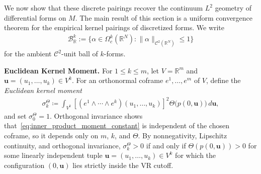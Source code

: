 \documentclass[11pt,reqno]{amsproc}
\numberwithin{equation}{section}
\newcommand{\R}{\mathbb{R}}
\newcommand{\bu}{\mathbf{u}}
\newcommand{\cB}{\mathcal{B}}
\newcommand{\cC}{\mathcal{C}}
\theoremstyle{definition}
\theoremstyle{plain}
\begin{document}
    We now show that these discrete pairings recover the continuum $L^2$ geometry of differential forms on $M$. The main result of this section is a uniform convergence theorem for the empirical kernel pairings of discretized forms.
    We write
    \begin{align} \label{eq:cB_ball}
        \cB_\R^k := \{\alpha \in \Omega^k_c(\R^N) : \|\alpha\|_{\cC^2(\R^N)} \leq 1\}
    \end{align}
    for the ambient $\cC^2$-unit ball of $k$-forms.

    \medskip
    \noindent\textbf{Euclidean Kernel Moment.}
        For $1\leq k\leq m$, let $V=\R^m$ and $\bu=(u_1,\ldots,u_k)\in V^k$. For an orthonormal coframe $e^1,\ldots,e^m$ of $V$, define the \emph{Euclidean kernel moment}
        \begin{align} \label{eq:inner_product_moment_constant}
            \sigma^\Theta_k
            \coloneqq
            \int_{V^k}
            \left[(e^1\wedge\cdots\wedge e^k)(u_1,\ldots,u_k)\right]^2
            \Theta\big(p(0,\bu)\big)\,d\bu,
        \end{align}
        and set $\sigma^\Theta_0=1$. Orthogonal invariance shows that~\eqref{eq:inner_product_moment_constant} is independent of the chosen coframe, so it depends only on $m$, $k$, and $\Theta$. By nonnegativity, Lipschitz continuity, and orthogonal invariance, $\sigma^\Theta_k>0$ if and only if $\Theta(p(0,\bu))>0$ for some linearly independent tuple $\bu=(u_1,\ldots,u_k)\in V^k$ for which the configuration $(0,\bu)$ lies strictly inside the VR cutoff.
    \medskip
\end{document}
